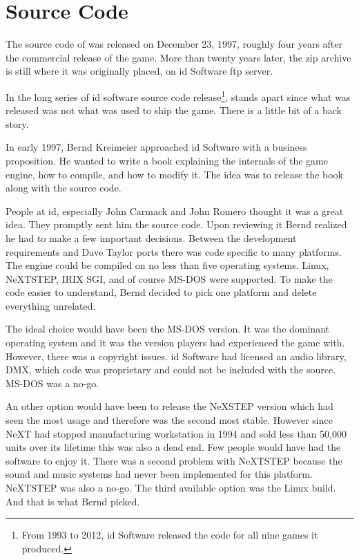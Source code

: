 \section{Source Code}
The source code of \doom{} was released on December 23, 1997, roughly four years after the commercial release of the game. More than twenty years later, the zip archive is still where it was originally placed, on id Software ftp server.\\
\par
{}
\par
 In the long series of id software source code release\footnote{From 1993 to 2012, id Software released the code for all nine games it produced.}, \doom{} stands apart since what was released was not what was used to ship the game. There is a little bit of a back story.\\
 \par
 In early 1997, Bernd Kreimeier approached id Software with a business proposition. He wanted to write a book explaining the internals of the game engine, how to compile, and how to modify it. The idea was to release the book along with the source code.\\
 \par
  People at id, especially John Carmack and John Romero thought it was a great idea. They promptly sent him the source code. Upon reviewing it Bernd realized he had to make a few important decisions. Between the development requirements and Dave Taylor ports there was code specific to many platforms. The engine could be compiled on no less than five operating systems. Linux, NeXTSTEP, IRIX SGI, and of course MS-DOS were supported. To make the code easier to understand, Bernd decided to pick one platform and delete everything unrelated.\\
  \par
  The ideal choice would have been the MS-DOS version. It was the dominant operating system and it was the version players had experienced the game with. However, there was a copyright issues. id Software had licensed an audio library, DMX, which code was proprietary and could not be included with the source. MS-DOS was a no-go.\\
  \par
   An other option would have been to release the NeXSTEP version which had seen the most usage and therefore was the second most stable. However since NeXT had stopped manufacturing workstation in 1994 and sold less than 50,000 units over its lifetime this was also a dead end. Few people would have had the software to enjoy it. There was a second problem with NeXTSTEP because the sound and music systems had never been implemented for this platform. NeXTSTEP was also a no-go. The third available option was the Linux build. And that is what Bernd picked.\\
